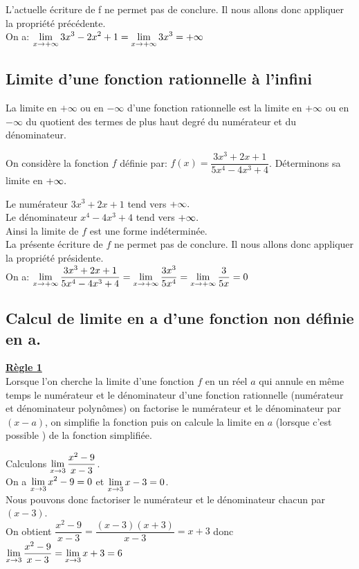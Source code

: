 L'actuelle écriture de f ne permet pas de conclure. Il nous allons donc appliquer la propriété précédente.\\
On a: \; $ \displaystyle \lim_{x\to +\infty}3x^{3}-2x^{2}+1=\displaystyle \lim_{x\to +\infty}3x^{3} =+\infty$



\subsection*{Limite d'une fonction rationnelle à l'infini}

\begin{property}
 La limite en $ +\infty $   ou  en $ -\infty $  d'une fonction rationnelle est la limite en  $ +\infty $   ou  en $ -\infty $  du quotient des termes de plus haut degré du numérateur et du dénominateur.
\end{property}

\begin{example}


On considère la fonction  $ f $ définie par:\; $ f(x)=\dfrac{3x^{3}+2x+1}{5x^{4}-4x^{3}+4} $. \;Déterminons sa limite en $ +\infty. $ 
\end{example}


Le numérateur   $ 3x^{3}+2x+1  $ tend vers $ +\infty. $\\
Le dénominateur $ x^{4}-4x^{3}+4 $ tend vers $ +\infty. $\\
Ainsi la limite de $ f $  est une forme indéterminée.\\
La présente écriture de $ f $ ne permet pas de conclure. Il nous allons donc appliquer la propriété présidente.\\
On  a:\;
$ \displaystyle \lim_{x\to +\infty}\frac{3x^{3}+2x+1}{5x^{4}-4x^{3}+4}=\displaystyle \lim_{x\to +\infty}\frac{3x^{3}}{5x^{4}}= \displaystyle \lim_{x\to +\infty}\frac{3}{5x}=0$


\subsection*{Calcul de limite  en  a  d'une fonction non définie en  a.}
\underline{\textbf{Règle 1}}\\
Lorsque l'on cherche la limite d'une fonction $ f $ en un réel $ a $ qui annule en
même temps le numérateur et le dénominateur d'une fonction rationnelle (numérateur et dénominateur polynômes) on factorise le numérateur et le
dénominateur par $( x - a )$, on simplifie la fonction puis on calcule la limite en $ a $ (lorsque c'est possible )  de la fonction simplifiée.
\begin{example}


Calculons $ \displaystyle \lim_{x\to 3}\frac{x^{2}-9}{x-3} $.\\ On a $ \displaystyle \lim_{x\to 3}x^{2}-9=0 $ et $ \displaystyle \lim_{x\to 3}x-3=0 $.\\Nous pouvons donc factoriser le numérateur et le dénominateur  chacun par $( x -3 )$.\\ On obtient  $ \dfrac{x^{2}-9}{x-3}=\dfrac{(x-3)(x+3)}{x-3}=x+3$ donc $ \displaystyle \lim_{x\to 3}\dfrac{x^{2}-9}{x-3}=\displaystyle \lim_{x\to 3}x+3 =6$
\end{example}



